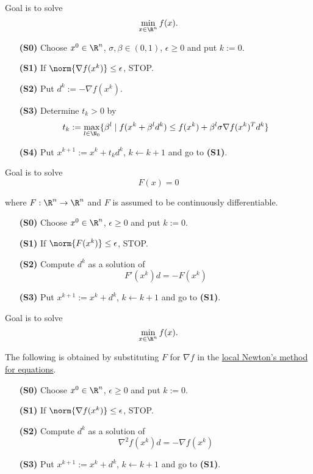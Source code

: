 Goal is to solve
$$\min_{x\in\R^n}f(x).$$

\begin{enumerate}
	\item [\textbf{(S0)}] Choose $x^0\in\R^n$, $\sigma,\beta\in(0,1)$, $\epsilon\geq0$ and put $k:=0$.
	\item [\textbf{(S1)}] If $\norm{\nabla f(x^k)}\leq\epsilon$, STOP.
	\item [\textbf{(S2)}] Put $d^k:=-\nabla f(x^k)$.
	\item [\textbf{(S3)}] Determine $t_k>0$ by
	      $$t_k:=\max_{l\in\N_0}\{\beta^l\mid f(x^k+\beta^ld^k)\leq f(x^k)+\beta^l\sigma\nabla f(x^k)^Td^k\}$$
	\item [\textbf{(S4)}] Put $x^{k+1}:=x^k+t_kd^k$, $k\gets k+1$ and go to \textbf{(S1)}.
\end{enumerate}

\label{abbc9be}

Goal is to solve
$$F(x)=0$$

where $F:\R^n\to\R^n$ and $F$ is assumed to be continuously differentiable.

\begin{enumerate}
	\item [\textbf{(S0)}] Choose $x^0\in\R^n$, $\epsilon\geq0$ and put $k:=0$.
	\item [\textbf{(S1)}] If $\norm{F(x^k)}\leq\epsilon$, STOP.
	\item [\textbf{(S2)}] Compute $d^k$ as a solution of
	      $$F'(x^k)d=-F(x^k)$$
	\item [\textbf{(S3)}] Put $x^{k+1}:=x^k+d^k$, $k\gets k+1$ and go to \textbf{(S1)}.
\end{enumerate}

\label{c2bcc4e}

Goal is to solve
$$\min_{x\in\R^n}f(x).$$

The following is obtained by substituting $F$ for $\nabla f$ in the
\href{abbc9be}{local Newton's method for equations}.

\begin{enumerate}
	\item [\textbf{(S0)}] Choose $x^0\in\R^n$, $\epsilon\geq0$ and put $k:=0$.
	\item [\textbf{(S1)}] If $\norm{\nabla f(x^k)}\leq\epsilon$, STOP.
	\item [\textbf{(S2)}] Compute $d^k$ as a solution of
	      $$\nabla^2f(x^k)d=-\nabla f(x^k)$$
	\item [\textbf{(S3)}] Put $x^{k+1}:=x^k+d^k$, $k\gets k+1$ and go to \textbf{(S1)}.
\end{enumerate}

